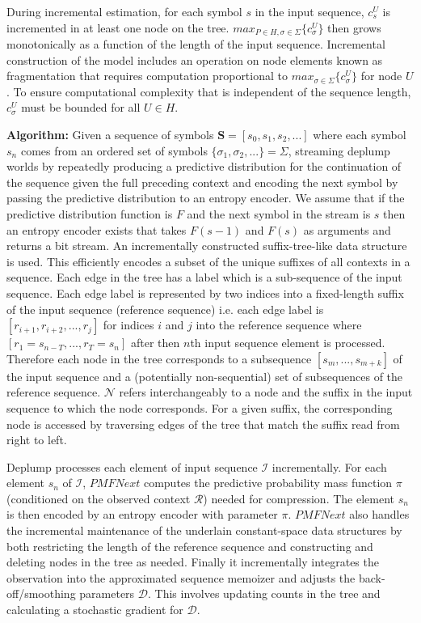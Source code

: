 During incremental estimation, for each symbol $s$ in the input sequence, $c_{s}^{U}$ is incremented in at least one node on the tree. $max_{P\in H, \sigma\in\Sigma}\{c_{\sigma}^{U}\}$ then grows monotonically as a function of the length of the input sequence. Incremental construction of the model includes an operation on node elements known as fragmentation that requires computation proportional to $max_{\sigma\in\Sigma}\{c_{\sigma}^{U}\}$ for node $U$. To ensure computational complexity that is independent of the sequence length, $c_{\sigma}^{U}$ must be bounded for all $U\in H$.

\textbf{Algorithm:} Given a sequence of symbols $\boldsymbol S=[s_{0}, s_{1}, s_{2}, ...]$ where each symbol $s_{n}$ comes from an ordered set of symbols $\{\sigma_{1}, \sigma_{2}, ...\}=\Sigma$, streaming deplump worlds by repeatedly producing a predictive distribution for the continuation of the sequence given the full preceding context and encoding the next symbol by passing the predictive distribution to an entropy encoder. We assume that if the predictive distribution function is $F$ and the next symbol in the stream is $s$ then an entropy encoder exists that takes $F(s-1)$ and $F(s)$ as arguments and returns a bit stream. An incrementally constructed suffix-tree-like data structure is used. This efficiently encodes a subset of the unique suffixes of all contexts in a sequence. Each edge in the tree has a label which is a sub-sequence of the input sequence. Each edge label is represented by two indices into a fixed-length suffix of the input sequence (reference sequence) i.e. each edge label is $[r_{i+1}, r_{i+2}, ..., r_{j}]$ for indices $i$ and $j$ into the reference sequence where $[r_{1}=s_{n-T}, ..., r_{T}=s_{n}]$ after then $n$th input sequence element is processed. Therefore each node in the tree corresponds to a subsequence $[s_{m}, ..., s_{m+k}]$ of the input sequence and a (potentially non-sequential) set of subsequences of the reference sequence. $\mathcal{N}$ refers interchangeably to a node and the suffix in the input sequence to which the node corresponds. For a given suffix, the corresponding node is accessed by traversing edges of the tree that match the suffix read from right to left.

Deplump processes each element of input sequence $\mathcal{I}$ incrementally. For each element $s_{n}$ of $\mathcal{I}$, $PMFNext$ computes the predictive probability mass function $\pi$ (conditioned on the observed context $\mathcal{R}$) needed for compression. The element $s_{n}$ is then encoded by an entropy encoder with parameter $\pi$. $PMFNext$ also handles the incremental maintenance of the underlain constant-space data structures by both restricting the length of the reference sequence and constructing and deleting nodes in the tree as needed. Finally it incrementally integrates the observation into the approximated sequence memoizer and adjusts the back-off/smoothing parameters $\mathcal{D}$. This involves updating counts in the tree and calculating a stochastic gradient for $\mathcal{D}$.

